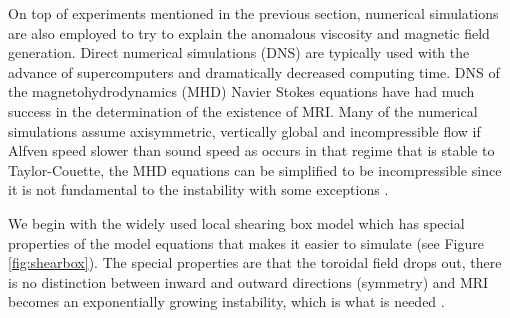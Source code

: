 \documentclass{jfm}
\begin{document}
On top of experiments mentioned in the previous section, numerical simulations
are also employed to try to explain the anomalous viscosity and magnetic field
generation. Direct numerical simulations (DNS) are typically used with the
advance of supercomputers and dramatically decreased computing time. DNS of the
magnetohydrodynamics (MHD) Navier Stokes equations have had much success in the
determination of the existence of MRI. Many of the numerical simulations assume
axisymmetric, vertically global and incompressible flow if Alfven speed slower
than sound speed as occurs in that regime that is stable to Taylor-Couette, the
MHD equations can be simplified to be incompressible since it is not
fundamental to the instability \cite{Balbus1991} with some exceptions
\cite{Sano1998}. 

We begin with the widely used local shearing box model \cite{Balbus1991} which
has special properties of the model equations that makes it easier to simulate
(see Figure \ref{fig:shearbox}). The special properties are that the toroidal
field drops out, there is no distinction between inward and outward directions
(symmetry) and MRI becomes an exponentially growing instability, which is what
is needed \cite{Julien2010}. 
\end{document}
